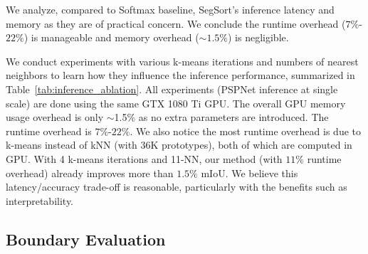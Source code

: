 \documentclass[10pt,twocolumn,letterpaper]{article}
\begin{document}
We analyze, compared to Softmax baseline, SegSort's inference latency and memory as they are of practical concern. We conclude the runtime overhead ($7\%$-$22\%$) is manageable and memory overhead ($\sim1.5\%$) is negligible.

We conduct experiments with various k-means iterations and numbers of nearest neighbors to learn how they influence the inference performance, summarized in Table~\ref{tab:inference_ablation}. All experiments (PSPNet inference at single scale) are done using the same GTX 1080 Ti GPU. The overall GPU memory usage overhead is only $\sim$1.5\% as no extra parameters are introduced. The runtime overhead is $7\%$-$22\%$. We also notice the most runtime overhead is due to k-means instead of kNN (with 36K prototypes), both of which are computed in GPU. With 4 k-means iterations and 11-NN, our method (with $11\%$ runtime overhead) already improves more than $1.5\%$ mIoU. We believe this  latency/accuracy trade-off is reasonable, particularly with the benefits such as interpretability.


\begin{table}[h]
  \vspace{-8pt}
  \centering
\caption{Ablation study on runtime (ms) and GPU memory (MiB).}
    \vspace{-9pt}
    \label{tab:inference_ablation}
\end{table}


\subsection{Boundary Evaluation}
\end{document}
